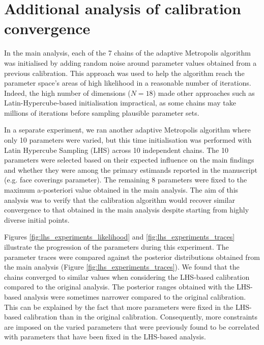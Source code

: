 
\section{Additional analysis of calibration convergence}

In the main analysis, each of the 7 chains of the adaptive Metropolis algorithm was initialised by adding random noise around parameter values obtained from a previous calibration. This approach was used to help the algorithm reach the parameter space's areas of high likelihood in a reasonable number of iterations. Indeed, the high number of dimensions ($N=18$) made other approaches such as Latin-Hypercube-based initialisation impractical, as some chains may take millions of iterations before sampling plausible parameter sets.

In a separate experiment, we ran another adaptive Metropolis algorithm where only 10 parameters were varied, but this time initialisation was performed with Latin Hypercube Sampling (LHS) across 10 independent chains. The 10 parameters were selected based on their expected influence on the main findings and whether they were among the primary estimands reported in the manuscript (e.g. face coverings parameter). The remaining 8 parameters were fixed to the maximum a-posteriori value obtained in the main analysis. The aim of this analysis was to verify that the calibration algorithm would recover similar convergence to that obtained in the main analysis despite starting from highly diverse initial points.

Figures \ref{fig:lhs_experiments_likelihood} and \ref{fig:lhs_experiments_traces} illustrate the progression of the parameters during this experiment. The parameter traces were compared against the posterior distributions obtained from the main analysis (Figure \ref{fig:lhs_experiments_traces}). We found that the chains converged to similar values when considering the LHS-based calibration compared to the original analysis. The posterior ranges obtained with the LHS-based analysis were sometimes narrower compared to the original calibration. This can be explained by the fact that more parameters were fixed in the LHS-based calibration than in the original calibration. Consequently, more constraints are imposed on the varied parameters that were previously found to be correlated with parameters that have been fixed in the LHS-based analysis.


